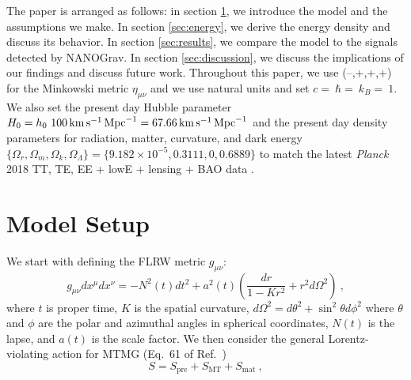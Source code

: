 \documentclass[prd,twocolumn,aps,psfig,nofootinbib,nobibnotes,superscriptaddress,preprintnumbers,times]{revtex4-2}
\newcommand{\s}{\,{\rm s}}
\newcommand{\km}{\,{\rm km}}
\newcommand{\Mpc}{\,{\rm Mpc}}
\begin{document}
The paper is arranged as follows: in section \ref{sec:setup}, we introduce the model and the assumptions we make. In section \ref{sec:energy}, we derive the energy density and discuss its behavior. In section \ref{sec:results}, we compare the model to the signals detected by NANOGrav. In section \ref{sec:discussion}, we discuss the implications of our findings and discuss future work. Throughout this paper, we use  (--,+,+,+) for the Minkowski metric $\eta_{\mu\nu}$ and we use natural units and set $c = $$\ \hbar = $$\ k_B = $$\ 1$. We also set the present day Hubble parameter $H_0 = h_0\ 100 \km \s^{-1}\Mpc^{-1} = 67.66 \km \s^{-1}\Mpc^{-1}$ and the present day density parameters for radiation, matter, curvature, and dark energy $\{\Omega_r, \Omega_m, \Omega_k, \Omega_\Lambda\} = \{9.182\times10^{-5},0.3111,0,0.6889\}$ to match the latest \textit{Planck} 2018 TT, TE, EE + lowE + lensing + BAO data \cite{Planck:2018vyg}.

\section{Model Setup}\label{sec:setup}
We start with defining the FLRW metric $g_{\mu\nu}$:
\begin{equation}\label{eqn:metric}
    g_{\mu\nu}dx^{\mu} dx^{\nu} = -N^2(t)dt^2 +a^2(t)\left(\frac{dr}{1-Kr^2} + r^2 d\Omega^2\right)\ ,
\end{equation}
where $t$ is proper time, $K$ is the spatial curvature, $d\Omega^2 = d\theta^2 + \sin^2\theta d\phi^2$ where $\theta$ and $\phi$ are the polar and azimuthal angles in spherical coordinates, $N(t)$ is the lapse, and $a(t)$ is the scale factor. We then consider the general Lorentz-violating action for MTMG (Eq.\ 61 of Ref.\ \cite{DeFelice:2015moy})
\begin{equation}\label{eqn:action}
    S = S_{\text{pre}} + S_{\text{MT}} + S_{\text{mat}}\ ,
\end{equation}
\end{document}
